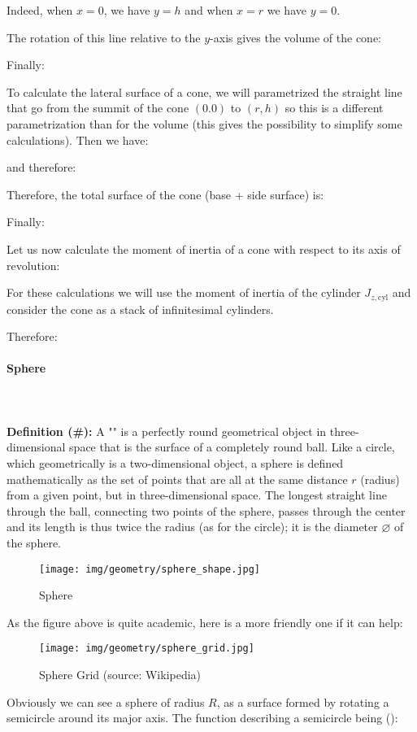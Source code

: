 {	Indeed, when $x=0$, we have $y=h$ and when $x=r$ we have $y=0$.
	
	The rotation of this line relative to the $y$-axis gives the volume of the cone:
	
	Finally:
	
	To calculate the lateral surface of a cone, we will parametrized the straight line that go from the summit of the cone $(0.0)$ to $(r, h)$ so this is a different parametrization than for the volume (this gives the possibility to simplify some calculations). Then we have:
	
	and therefore:
	
	Therefore, the total surface of the cone (base + side surface) is:
	
	Finally:
	
	Let us now calculate the moment of inertia of a cone with respect to its axis of revolution:

	For these calculations we will use the moment of inertia of the cylinder $J_{z,\text{cyl}}$ and consider the cone as a stack of infinitesimal cylinders.
	
	Therefore:
	
	
	\pagebreak
	\paragraph{Sphere}\mbox{}\\\\
	\textbf{Definition (\#\mydef):} A "\label{sphere}" is a perfectly round geometrical object in three-dimensional space that is the surface of a completely round ball. Like a circle, which geometrically is a two-dimensional object, a sphere is defined mathematically as the set of points that are all at the same distance $r$ (radius) from a given point, but in three-dimensional space. The longest straight line through the ball, connecting two points of the sphere, passes through the center and its length is thus twice the radius (as for the circle); it is the diameter $\varnothing$ of the sphere.
	\begin{figure}[H]
		\centering
		\texttt{[image: img/geometry/sphere\_shape.jpg]}
		\caption{Sphere}
	\end{figure}
	As the figure above is quite academic, here is a more friendly one if it can help:
	\begin{figure}[H]
		\centering
		\texttt{[image: img/geometry/sphere\_grid.jpg]}
		\caption[Sphere Grid]{Sphere Grid (source: Wikipedia)}
	\end{figure}
	Obviously we can see a sphere of radius $R$, as a surface formed by rotating a semicircle around its major axis. The function describing a semicircle being ():
	
}
